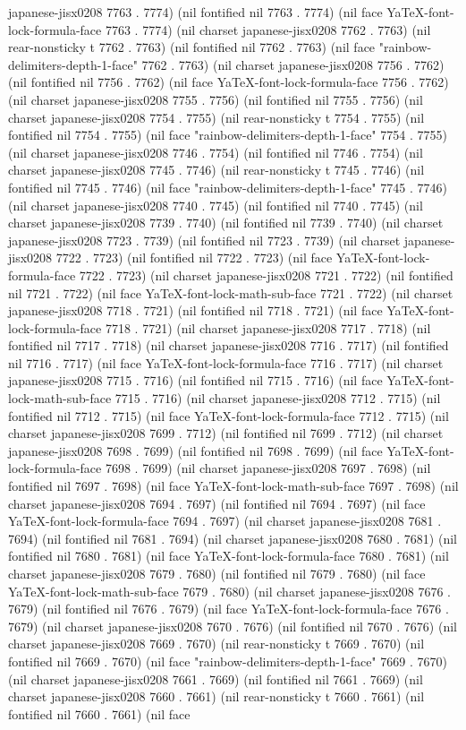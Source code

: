 japanese-jisx0208 7763 . 7774) (nil fontified nil 7763 . 7774) (nil face YaTeX-font-lock-formula-face 7763 . 7774) (nil charset japanese-jisx0208 7762 . 7763) (nil rear-nonsticky t 7762 . 7763) (nil fontified nil 7762 . 7763) (nil face "rainbow-delimiters-depth-1-face" 7762 . 7763) (nil charset japanese-jisx0208 7756 . 7762) (nil fontified nil 7756 . 7762) (nil face YaTeX-font-lock-formula-face 7756 . 7762) (nil charset japanese-jisx0208 7755 . 7756) (nil fontified nil 7755 . 7756) (nil charset japanese-jisx0208 7754 . 7755) (nil rear-nonsticky t 7754 . 7755) (nil fontified nil 7754 . 7755) (nil face "rainbow-delimiters-depth-1-face" 7754 . 7755) (nil charset japanese-jisx0208 7746 . 7754) (nil fontified nil 7746 . 7754) (nil charset japanese-jisx0208 7745 . 7746) (nil rear-nonsticky t 7745 . 7746) (nil fontified nil 7745 . 7746) (nil face "rainbow-delimiters-depth-1-face" 7745 . 7746) (nil charset japanese-jisx0208 7740 . 7745) (nil fontified nil 7740 . 7745) (nil charset japanese-jisx0208 7739 . 7740) (nil fontified nil 7739 . 7740) (nil charset japanese-jisx0208 7723 . 7739) (nil fontified nil 7723 . 7739) (nil charset japanese-jisx0208 7722 . 7723) (nil fontified nil 7722 . 7723) (nil face YaTeX-font-lock-formula-face 7722 . 7723) (nil charset japanese-jisx0208 7721 . 7722) (nil fontified nil 7721 . 7722) (nil face YaTeX-font-lock-math-sub-face 7721 . 7722) (nil charset japanese-jisx0208 7718 . 7721) (nil fontified nil 7718 . 7721) (nil face YaTeX-font-lock-formula-face 7718 . 7721) (nil charset japanese-jisx0208 7717 . 7718) (nil fontified nil 7717 . 7718) (nil charset japanese-jisx0208 7716 . 7717) (nil fontified nil 7716 . 7717) (nil face YaTeX-font-lock-formula-face 7716 . 7717) (nil charset japanese-jisx0208 7715 . 7716) (nil fontified nil 7715 . 7716) (nil face YaTeX-font-lock-math-sub-face 7715 . 7716) (nil charset japanese-jisx0208 7712 . 7715) (nil fontified nil 7712 . 7715) (nil face YaTeX-font-lock-formula-face 7712 . 7715) (nil charset japanese-jisx0208 7699 . 7712) (nil fontified nil 7699 . 7712) (nil charset japanese-jisx0208 7698 . 7699) (nil fontified nil 7698 . 7699) (nil face YaTeX-font-lock-formula-face 7698 . 7699) (nil charset japanese-jisx0208 7697 . 7698) (nil fontified nil 7697 . 7698) (nil face YaTeX-font-lock-math-sub-face 7697 . 7698) (nil charset japanese-jisx0208 7694 . 7697) (nil fontified nil 7694 . 7697) (nil face YaTeX-font-lock-formula-face 7694 . 7697) (nil charset japanese-jisx0208 7681 . 7694) (nil fontified nil 7681 . 7694) (nil charset japanese-jisx0208 7680 . 7681) (nil fontified nil 7680 . 7681) (nil face YaTeX-font-lock-formula-face 7680 . 7681) (nil charset japanese-jisx0208 7679 . 7680) (nil fontified nil 7679 . 7680) (nil face YaTeX-font-lock-math-sub-face 7679 . 7680) (nil charset japanese-jisx0208 7676 . 7679) (nil fontified nil 7676 . 7679) (nil face YaTeX-font-lock-formula-face 7676 . 7679) (nil charset japanese-jisx0208 7670 . 7676) (nil fontified nil 7670 . 7676) (nil charset japanese-jisx0208 7669 . 7670) (nil rear-nonsticky t 7669 . 7670) (nil fontified nil 7669 . 7670) (nil face "rainbow-delimiters-depth-1-face" 7669 . 7670) (nil charset japanese-jisx0208 7661 . 7669) (nil fontified nil 7661 . 7669) (nil charset japanese-jisx0208 7660 . 7661) (nil rear-nonsticky t 7660 . 7661) (nil fontified nil 7660 . 7661) (nil face 